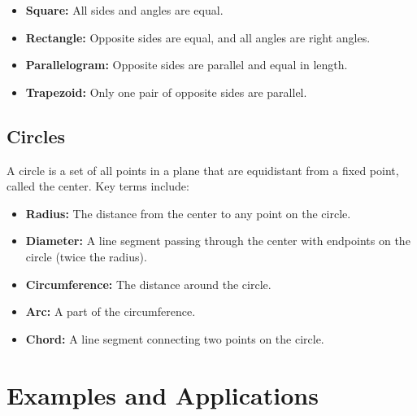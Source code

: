 \documentclass[12pt]{article}
\begin{document}
\begin{itemize}
    \item \textbf{Square:} All sides and angles are equal.
    \item \textbf{Rectangle:} Opposite sides are equal, and all angles are right angles.
    \item \textbf{Parallelogram:} Opposite sides are parallel and equal in length.
    \item \textbf{Trapezoid:} Only one pair of opposite sides are parallel.
\end{itemize}


\subsection*{Circles}
A circle is a set of all points in a plane that are equidistant from a fixed point, called the center. Key terms include:

\begin{itemize}
    \item \textbf{Radius:} The distance from the center to any point on the circle.
    \item \textbf{Diameter:} A line segment passing through the center with endpoints on the circle (twice the radius).
    \item \textbf{Circumference:} The distance around the circle.
    \item \textbf{Arc:} A part of the circumference.
    \item \textbf{Chord:} A line segment connecting two points on the circle.
\end{itemize}


\section*{Examples and Applications}
\end{document}

